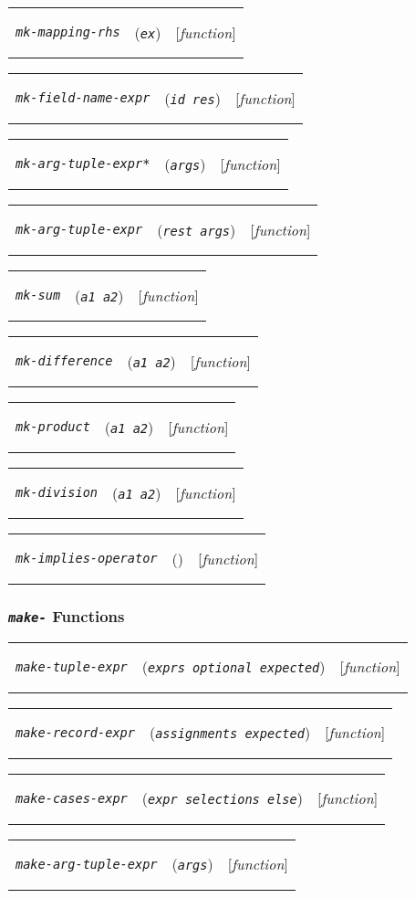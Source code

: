 \documentclass[12pt]{book}
\makeatletter
\def\ampoptional{{\smaller\sc {\smaller\smaller \&}optional\ }}
\def\amprest{{\smaller\sc {\smaller\smaller \&}rest\ }}
\newenvironment{function}[3]%
{\par\noindent\begin{boxedminipage}{\textwidth}%
 \par\noindent\begin{tabularx}{\linewidth}{l>{\raggedright}Xr}%
 \functionhtgt{#1}&(\texttt{\textit{#2}})&[\emph{#3}]%
 \end{tabularx}\par\flushright\begin{minipage}{.97\textwidth}}
{\end{minipage}\end{boxedminipage}}
\newcommand{\functionnm}[1]{\texttt{\textit{#1}}}
\newcommand{\functionhtgt}[1]{\hypertarget{#1}{\functionnm{#1}}\index{#1@\functionnm{#1}|underline}}
\newenvironment{lispfunction}[2]%
{\begin{function}{#1}{#2}{function}}{\end{function}}
\makeatother
\begin{document}
\begin{lispfunction}{mk-mapping-rhs}{ex}
\end{lispfunction}

\begin{lispfunction}{mk-field-name-expr}{id res}
\end{lispfunction}

\begin{lispfunction}{mk-arg-tuple-expr*}{args}
\end{lispfunction}

\begin{lispfunction}{mk-arg-tuple-expr}{\amprest args}
\end{lispfunction}

\begin{lispfunction}{mk-sum}{a1 a2}
\end{lispfunction}

\begin{lispfunction}{mk-difference}{a1 a2}
\end{lispfunction}

\begin{lispfunction}{mk-product}{a1 a2}
\end{lispfunction}

\begin{lispfunction}{mk-division}{a1 a2}
\end{lispfunction}

\begin{lispfunction}{mk-implies-operator}{}
\end{lispfunction}


\subsubsection*{\functionnm{make-} Functions}

\begin{lispfunction}{make-tuple-expr}{exprs \ampoptional expected}
\end{lispfunction}

\begin{lispfunction}{make-record-expr}{assignments expected}
\end{lispfunction}

\begin{lispfunction}{make-cases-expr}{expr selections else}
\end{lispfunction}

\begin{lispfunction}{make-arg-tuple-expr}{args}
\end{lispfunction}
\end{document}
